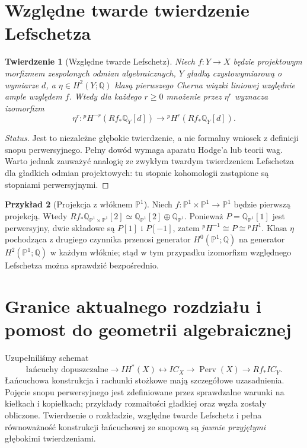 \documentclass[11pt,a4paper,oneside]{report}
\newcommand{\Q}{\mathbb{Q}}
\theoremstyle{plain}
\newtheorem{twierdzenie}{Twierdzenie}[section]
\theoremstyle{definition}
\newtheorem{przyklad}[twierdzenie]{Przykład}
\theoremstyle{remark}
\begin{document}
\section{Względne twarde twierdzenie Lefschetza}
\begin{twierdzenie}[Względne twarde Lefschetz]
\label{thm:relative-hard-lefschetz-xiii}
Niech $f:Y\to X$ będzie projektowym morfizmem
zespolonych odmian algebraicznych, $Y$
gładką czystowymiarową o wymiarze $d$,
a $\eta\in H^2(Y;\Q)$ klasą pierwszego Cherna
wiązki liniowej względnie ample względem $f$.
Wtedy dla każdego $r\ge0$ mnożenie przez
$\eta^r$ wyznacza izomorfizm
\[
\eta^r:{}^p\!H^{-r}(Rf_*\Q_Y[d])
\longrightarrow{}^p\!H^{r}(Rf_*\Q_Y[d]).
\]
\end{twierdzenie}
\begin{proof}[Status]
Jest to niezależne głębokie twierdzenie, a nie
formalny wniosek z definicji snopu perwersyjnego.
Pełny dowód wymaga aparatu Hodge'a lub teorii wag.
Warto jednak zauważyć analogię ze zwykłym twardym
twierdzeniem Lefschetza dla gładkich odmian
projektowych: tu stopnie kohomologii zastąpione
są stopniami perwersyjnymi.
\end{proof}
\begin{przyklad}[Projekcja z włóknem $\mathbb P^1$]
Niech $f:\mathbb P^1\times\mathbb P^1\to\mathbb P^1$
będzie pierwszą projekcją. Wtedy
$Rf_*\Q_{\mathbb P^1\times\mathbb P^1}[2]
\simeq\Q_{\mathbb P^1}[2]\oplus\Q_{\mathbb P^1}$.
Ponieważ $P=\Q_{\mathbb P^1}[1]$ jest perwersyjny,
dwie składowe są $P[1]$ i $P[-1]$, zatem
${}^p\!H^{-1}\cong P\cong{}^p\!H^{1}$.
Klasa $\eta$ pochodząca z drugiego czynnika
przenosi generator $H^0(\mathbb P^1;\Q)$ na
generator $H^2(\mathbb P^1;\Q)$ w każdym włóknie;
stąd w tym przypadku izomorfizm względnego
Lefschetza można sprawdzić bezpośrednio.
\end{przyklad}

\section{Granice aktualnego rozdziału i pomost do geometrii algebraicznej}
Uzupełniliśmy schemat
\[
\text{łańcuchy dopuszczalne}
\longrightarrow IH^*(X)
\longleftrightarrow IC_X
\longrightarrow\operatorname{Perv}(X)
\longrightarrow Rf_*IC_Y.
\]
Łańcuchowa konstrukcja i rachunki stożkowe
mają szczegółowe uzasadnienia. Pojęcie snopu
perwersyjnego jest zdefiniowane przez
sprawdzalne warunki na kiełkach i kopiełkach;
przykłady rozmaitości gładkiej oraz węzła
zostały obliczone. Twierdzenie o rozkładzie,
względne twarde Lefschetz i pełna równoważność
konstrukcji łańcuchowej ze snopową są
\emph{jawnie przyjętymi} głębokimi twierdzeniami.
\end{document}
